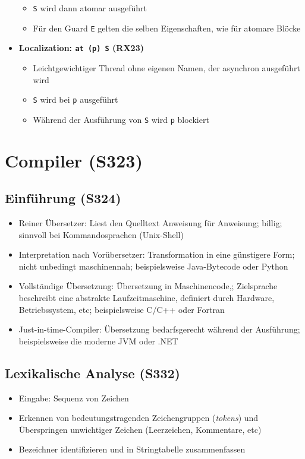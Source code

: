 \begin{itemize}
\begin{itemize}
		\item \texttt{S} wird dann atomar ausgeführt
		\item Für den Guard \texttt{E} gelten die selben Eigenschaften, wie für atomare Blöcke
	\end{itemize}
	\item \textbf{Localization: \texttt{at (p) S} (RX23)}
	\begin{itemize}
		\item Leichtgewichtiger Thread ohne eigenen Namen, der asynchron ausgeführt wird
		\item \texttt{S} wird bei \texttt{p} ausgeführt
		\item Während der Ausführung von \texttt{S} wird \texttt{p} blockiert
	\end{itemize}
\end{itemize}



\section{Compiler (S323)}

\subsection{Einführung (S324)}
\begin{itemize}
	\item Reiner Übersetzer: Liest den Quelltext Anweisung für Anweisung; billig; sinnvoll bei Kommandosprachen (Unix-Shell)
	\item Interpretation nach Vorübersetzer: Transformation in eine günstigere Form; nicht unbedingt maschinennah; beispielsweise Java-Bytecode oder Python
	\item Vollständige Übersetzung: Übersetzung in Maschinencode,; Zielsprache beschreibt eine abstrakte Laufzeitmaschine, definiert durch Hardware, Betriebssystem, etc; beispielsweise C/C++ oder Fortran
	\item Just-in-time-Compiler: Übersetzung bedarfsgerecht während der Ausführung; beispielsweise die moderne JVM oder .NET
\end{itemize}


\subsection{Lexikalische Analyse (S332)}
\begin{itemize}
	\item Eingabe: Sequenz von Zeichen
	\item Erkennen von bedeutungstragenden Zeichengruppen (\textit{tokens}) und Überspringen unwichtiger Zeichen (Leerzeichen, Kommentare, etc)
	\item Bezeichner identifizieren und in Stringtabelle zusammenfassen
\end{itemize}

